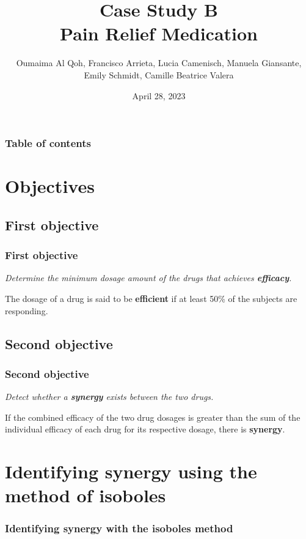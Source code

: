 \documentclass[14pt]{beamer}
\author{Oumaima Al Qoh, Francisco Arrieta, Lucia Camenisch, Manuela Giansante, Emily Schmidt, Camille Beatrice Valera}
\title{Case Study B \\ Pain Relief Medication}
\date{April 28, 2023}
\begin{document}
\begin{frame}
\titlepage
\end{frame}



\begin{frame}
\frametitle{Table of contents}
\tableofcontents
\end{frame}


\section{Objectives}
\subsection{First objective}
\begin{frame}
\frametitle{First objective}
\textit{Determine the minimum dosage amount of the drugs that achieves \textbf{efficacy}.}

\bigskip

The dosage of a drug is said to be \textbf{efficient} if at least 50\% of the subjects are responding.
\end{frame}


\subsection{Second objective}
\begin{frame}
\frametitle{Second objective}
\textit{Detect whether a \textbf{synergy} exists between the two drugs.}

\bigskip

If the combined efficacy of the two drug dosages is greater than the sum of the individual efficacy of each drug for its respective dosage, there is \textbf{synergy}.
\end{frame}


\section{Identifying synergy using the method of isoboles}
\begin{frame}
\frametitle{Identifying synergy with the isoboles method}

\end{frame}
\end{document}
